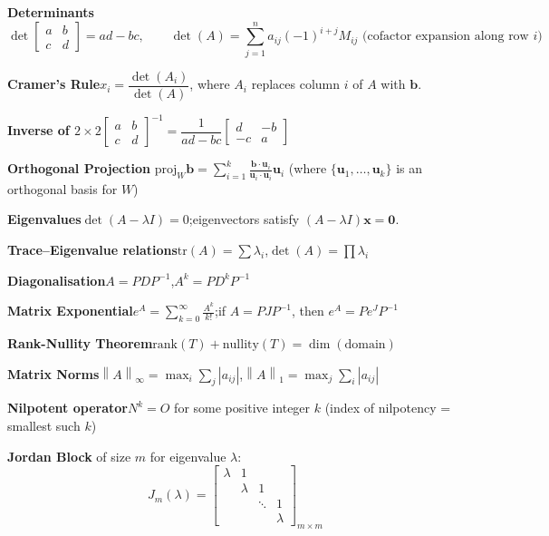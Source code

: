 \documentclass[12pt,a4paper]{article}
\newcommand{\mat}[1]{\begin{bmatrix}#1\end{bmatrix}}
\newcommand{\norm}[1]{\left\lVert #1 \right\rVert}
\begin{document}
	\begin{tcolorbox}[colback=gray!5, colframe=gray!40, fonttitle=\bfseries, title={Key Formulae — for Reference}]
		
		\textbf{Determinants}
		\[
		\det\mat{a&b\\c&d} = ad-bc, \qquad
		\det(A) = \sum_{j=1}^{n}a_{ij}(-1)^{i+j}M_{ij} \text{ (cofactor expansion along row }i)
		\]
		
		\textbf{Cramer's Rule}\quad $x_i = \dfrac{\det(A_i)}{\det(A)}$, \;where $A_i$ replaces column $i$ of $A$ with $\mathbf{b}$.
		
		\textbf{Inverse of $2\times2$}\quad $\mat{a&b\\c&d}^{-1} = \dfrac{1}{ad-bc}\mat{d&-b\\-c&a}$
		
		\textbf{Orthogonal Projection}\quad
		$\text{proj}_W\mathbf{b} = \displaystyle\sum_{i=1}^{k}\frac{\mathbf{b}\cdot\mathbf{u}_i}{\mathbf{u}_i\cdot\mathbf{u}_i}\mathbf{u}_i$
		\quad (where $\{\mathbf{u}_1,\ldots,\mathbf{u}_k\}$ is an orthogonal basis for $W$)
		
		\textbf{Eigenvalues}\quad $\det(A - \lambda I) = 0$;\quad eigenvectors satisfy $(A-\lambda I)\mathbf{x}=\mathbf{0}$.
		
		\textbf{Trace–Eigenvalue relations}\quad $\text{tr}(A)=\sum\lambda_i$,\quad $\det(A)=\prod\lambda_i$
		
		\textbf{Diagonalisation}\quad $A = PDP^{-1}$,\quad $A^k = PD^kP^{-1}$
		
		\textbf{Matrix Exponential}\quad $e^A = \displaystyle\sum_{k=0}^{\infty}\frac{A^k}{k!}$;\quad if $A=PJP^{-1}$, then $e^A = Pe^JP^{-1}$
		
		\textbf{Rank-Nullity Theorem}\quad $\text{rank}(T)+\text{nullity}(T)=\dim(\text{domain})$
		
		\textbf{Matrix Norms}\quad $\norm{A}_\infty = \max_i\sum_j|a_{ij}|$,\quad $\norm{A}_1=\max_j\sum_i|a_{ij}|$
		
		\textbf{Nilpotent operator}\quad $N^k=O$ for some positive integer $k$ (index of nilpotency = smallest such $k$)
		
		\textbf{Jordan Block} of size $m$ for eigenvalue $\lambda$:
		\[
		J_m(\lambda) = \mat{\lambda & 1 & & \\ & \lambda & 1 & \\ & & \ddots & 1\\ & & & \lambda}_{m\times m}
		\]
		
	\end{tcolorbox}
	
\end{document}
